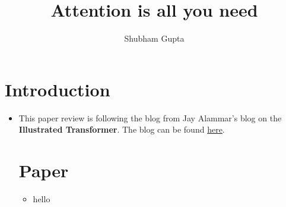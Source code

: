 \documentclass[a4paper]{article}
\title{Attention is all you need}
\author{Shubham Gupta}
\begin{document}
\maketitle
\section{Introduction}
\begin{itemize}
    \item This paper review is following the blog from Jay Alammar's blog on the \textbf{Illustrated Transformer}. The blog can be found \href{https://jalammar.github.io/illustrated-transformer/}{here}.  
\section{Paper}
\begin{itemize}
    \item  hello
\end{itemize}
\end{itemize}
\end{document}
